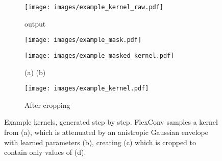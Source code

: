 \documentclass{article} \usepackage{iclr2022_conference,times}
\begin{document}
\begin{figure}
    \centering
     \begin{subfigure}[c]{0.24\textwidth}
\centering
         \texttt{[image: images/example\_kernel\_raw.pdf]}
         \caption{ output}
\label{fig:flexconvexample-raw}
     \end{subfigure}
\begin{subfigure}[c]{0.24\textwidth}
\centering
         \texttt{[image: images/example\_mask.pdf]}
\caption{ }
         \label{fig:flexconvexample-mask}
     \end{subfigure}
     \begin{subfigure}[c]{0.24\textwidth}
\centering
         \texttt{[image: images/example\_masked\_kernel.pdf]}
\caption{
          (a)  (b)}
         \label{fig:flexconvexample-maskedkernel}
     \end{subfigure}
     \begin{subfigure}[c]{0.24\textwidth}
\centering
         \texttt{[image: images/example\_kernel.pdf]}
\caption{After cropping}
         \label{fig:flexconvexample-kernel}
     \end{subfigure}
    \caption{Example kernels, generated step by step. FlexConv samples a kernel from   (a), which is attenuated by an anistropic Gaussian envelope with learned parameters  (b), creating (c) which is cropped to contain only values of  (d).
    \vspace{-2mm}}
    \label{fig:app-flexconvexample}
\end{figure}
\end{document}
